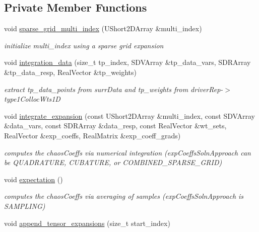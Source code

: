 \subsection*{Private Member Functions}
\begin{DoxyCompactItemize}
\item 
void \hyperlink{classPecos_1_1ProjectOrthogPolyApproximation_af8b9dd9938e91785988cc1a6886d87a9}{sparse\+\_\+grid\+\_\+multi\+\_\+index} (U\+Short2\+D\+Array \&multi\+\_\+index)\label{classPecos_1_1ProjectOrthogPolyApproximation_af8b9dd9938e91785988cc1a6886d87a9}

\begin{DoxyCompactList}\small\item\em initialize multi\+\_\+index using a sparse grid expansion \end{DoxyCompactList}\item 
void \hyperlink{classPecos_1_1ProjectOrthogPolyApproximation_a97c9838f5a9fcce6e448d47f21c77d2f}{integration\+\_\+data} (size\+\_\+t tp\+\_\+index, S\+D\+V\+Array \&tp\+\_\+data\+\_\+vars, S\+D\+R\+Array \&tp\+\_\+data\+\_\+resp, Real\+Vector \&tp\+\_\+weights)\label{classPecos_1_1ProjectOrthogPolyApproximation_a97c9838f5a9fcce6e448d47f21c77d2f}

\begin{DoxyCompactList}\small\item\em extract tp\+\_\+data\+\_\+points from surr\+Data and tp\+\_\+weights from driver\+Rep-\/$>$type1\+Colloc\+Wts1D \end{DoxyCompactList}\item 
void \hyperlink{classPecos_1_1ProjectOrthogPolyApproximation_aead9a68c85feba994da85a179d32f474}{integrate\+\_\+expansion} (const U\+Short2\+D\+Array \&multi\+\_\+index, const S\+D\+V\+Array \&data\+\_\+vars, const S\+D\+R\+Array \&data\+\_\+resp, const Real\+Vector \&wt\+\_\+sets, Real\+Vector \&exp\+\_\+coeffs, Real\+Matrix \&exp\+\_\+coeff\+\_\+grads)
\begin{DoxyCompactList}\small\item\em computes the chaos\+Coeffs via numerical integration (exp\+Coeffs\+Soln\+Approach can be Q\+U\+A\+D\+R\+A\+T\+U\+RE, C\+U\+B\+A\+T\+U\+RE, or C\+O\+M\+B\+I\+N\+E\+D\+\_\+\+S\+P\+A\+R\+S\+E\+\_\+\+G\+R\+ID) \end{DoxyCompactList}\item 
void \hyperlink{classPecos_1_1ProjectOrthogPolyApproximation_ab2c39d08bc874d872b0c910dc72d05dc}{expectation} ()
\begin{DoxyCompactList}\small\item\em computes the chaos\+Coeffs via averaging of samples (exp\+Coeffs\+Soln\+Approach is S\+A\+M\+P\+L\+I\+NG) \end{DoxyCompactList}\item 
void \hyperlink{classPecos_1_1ProjectOrthogPolyApproximation_a284a7cf7352dcc2efef9aed24ea4c654}{append\+\_\+tensor\+\_\+expansions} (size\+\_\+t start\+\_\+index)\label{classPecos_1_1ProjectOrthogPolyApproximation_a284a7cf7352dcc2efef9aed24ea4c654}


\end{DoxyCompactItemize}
